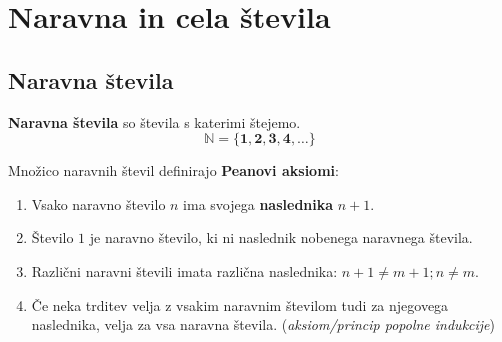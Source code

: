 \chapter{Naravna in cela števila}

 
     \section{Naravna števila}

            \textbf{Naravna števila} so števila s katerimi štejemo.
            $$\mathbf{\mathbb{N}=\{1, 2, 3, 4, \ldots\}}$$
         

          
            Množico naravnih števil definirajo \textbf{Peanovi aksiomi}:
            \begin{enumerate}
                \item Vsako naravno število $n$ ima svojega \textbf{naslednika} $n+1$.
                \item Število $1$ je naravno število, ki ni naslednik nobenega naravnega števila.
                \item Različni naravni števili imata različna naslednika: $n+1 \neq m+1; n \neq m$.
                \item Če neka trditev velja z vsakim naravnim številom tudi za njegovega naslednika, velja za vsa naravna števila. (\textit{aksiom/princip popolne indukcije})
            \end{enumerate}

         
 

 

            ~ 

